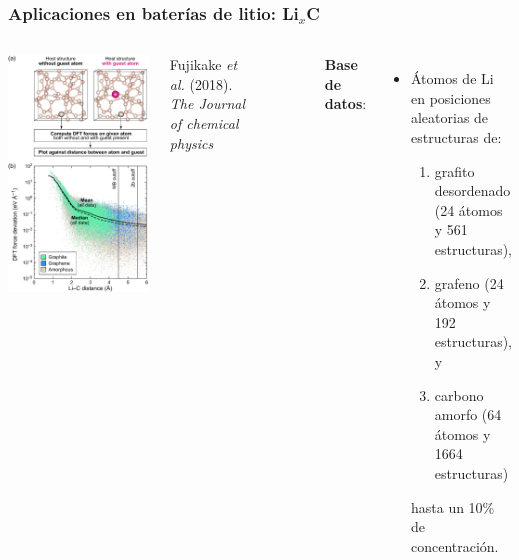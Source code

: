\documentclass[aspectratio=169]{beamer}
\let\oldtextbf\textbf
\renewcommand{\textbf}[1]{\textcolor{nordblue}{\oldtextbf{#1}}}
\begin{document}
    \begin{frame}
        \frametitle{Aplicaciones en baterías de litio: Li$_x$C}
        
        \begin{columns}
            \begin{center}
                \includegraphics[width=0.7\columnwidth]{LiC-fuerza_1_atomo_de_Li.png}
            \end{center}

            {\tiny Fujikake \textit{et al.} (2018). \textit{The Journal of chemical
            physics}}

            \

            \

            \textbf{Base de datos}:
            \begin{itemize}
                \item Átomos de Li en posiciones aleatorias de estructuras de:
                    \begin{enumerate}
                        \item grafito desordenado (24 átomos y 561 estructuras), 
                        \item grafeno (24 átomos y 192 estructuras), y
                        \item carbono amorfo (64 átomos y 1664 estructuras)
                    \end{enumerate}
                    hasta un 10\% de concentración.
            \end{itemize}
        \end{columns}

    \end{frame}
    
\end{document}
